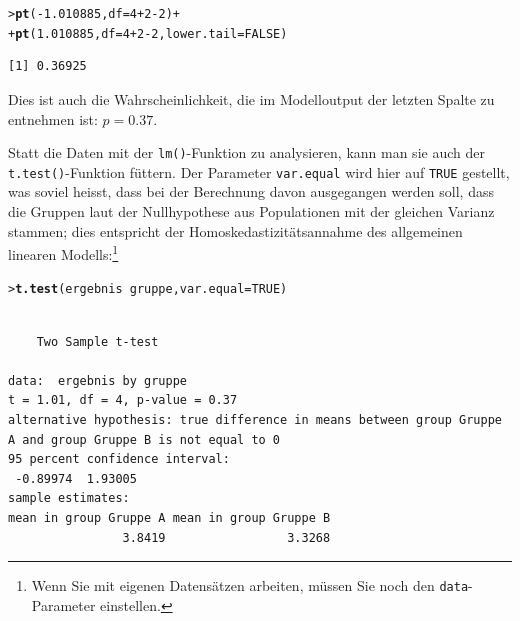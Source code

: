 \documentclass[oneside, 10pt]{book}\usepackage[]{graphicx}\usepackage[]{xcolor}
\makeatletter
\newcommand{\hlnum}[1]{\textcolor[rgb]{0.686,0.059,0.569}{#1}}%
\newcommand{\hlopt}[1]{\textcolor[rgb]{0,0,0}{#1}}%
\newcommand{\hlstd}[1]{\textcolor[rgb]{0.345,0.345,0.345}{#1}}%
\newcommand{\hlkwc}[1]{\textcolor[rgb]{0.333,0.667,0.333}{#1}}%
\newcommand{\hlkwd}[1]{\textcolor[rgb]{0.737,0.353,0.396}{\textbf{#1}}}%
\newenvironment{kframe}{%
 \def\at@end@of@kframe{}%
 \ifinner\ifhmode%
  \def\at@end@of@kframe{\end{minipage}}%
  \begin{minipage}{\columnwidth}%
 \fi\fi%
 \def\FrameCommand##1{\hskip\@totalleftmargin \hskip-\fboxsep
 \colorbox{shadecolor}{##1}\hskip-\fboxsep
     \hskip-\linewidth \hskip-\@totalleftmargin \hskip\columnwidth}%
 \MakeFramed {\advance\hsize-\width
   \@totalleftmargin\z@ \linewidth\hsize
   \@setminipage}}%
 {\par\unskip\endMakeFramed%
 \at@end@of@kframe}
\newenvironment{knitrout}{}{} %
\makeatother
\begin{document}
\begin{knitrout}
\color{fgcolor}\begin{kframe}
\begin{alltt}
\hlstd{> }\hlkwd{pt}\hlstd{(}\hlopt{-}\hlnum{1.010885}\hlstd{,} \hlkwc{df} \hlstd{=} \hlnum{4} \hlopt{+} \hlnum{2} \hlopt{-} \hlnum{2}\hlstd{)} \hlopt{+}
\hlstd{+ }  \hlkwd{pt}\hlstd{(}\hlnum{1.010885}\hlstd{,} \hlkwc{df} \hlstd{=} \hlnum{4} \hlopt{+} \hlnum{2} \hlopt{-} \hlnum{2}\hlstd{,} \hlkwc{lower.tail} \hlstd{=} \hlnum{FALSE}\hlstd{)}
\end{alltt}
\begin{verbatim}
[1] 0.36925
\end{verbatim}
\end{kframe}
\end{knitrout}

Dies ist auch die Wahrscheinlichkeit, die im
Modelloutput der letzten Spalte zu entnehmen ist: $p = 0.37$.

Statt die Daten mit der \texttt{lm()}-Funktion zu analysieren,
kann man sie auch der \texttt{t.test()}-Funktion füttern.
Der Parameter \texttt{var.equal} wird hier auf \texttt{TRUE}
gestellt, was soviel heisst, dass bei der Berechnung davon
ausgegangen werden soll, dass die Gruppen laut der Nullhypothese
aus Populationen mit der gleichen Varianz stammen;
dies entspricht der Homoskedastizitätsannahme des allgemeinen
linearen Modells:\footnote{Wenn Sie mit eigenen Datensätzen arbeiten, müssen Sie noch den \texttt{data}-Parameter einstellen.}

\begin{knitrout}
\color{fgcolor}\begin{kframe}
\begin{alltt}
\hlstd{> }\hlkwd{t.test}\hlstd{(ergebnis} \hlopt{~} \hlstd{gruppe,} \hlkwc{var.equal} \hlstd{=} \hlnum{TRUE}\hlstd{)}
\end{alltt}
\begin{verbatim}

	Two Sample t-test

data:  ergebnis by gruppe
t = 1.01, df = 4, p-value = 0.37
alternative hypothesis: true difference in means between group Gruppe A and group Gruppe B is not equal to 0
95 percent confidence interval:
 -0.89974  1.93005
sample estimates:
mean in group Gruppe A mean in group Gruppe B 
                3.8419                 3.3268 
\end{verbatim}
\end{kframe}
\end{knitrout}
\end{document}
